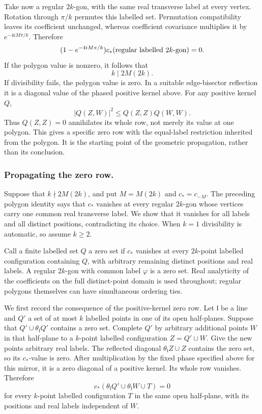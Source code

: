 \documentclass[11pt,letterpaper,reqno]{amsart}
\theoremstyle{definition}
\theoremstyle{remark}
\begin{document}
Take now a regular $2k$-gon, with the same real transverse label at
every vertex. Rotation through $\pi/k$ permutes this labelled set.
Permutation compatibility leaves its coefficient unchanged, whereas
coefficient covariance multiplies it by $e^{-4iM\pi/k}$. Therefore
\[
 (1-e^{-4iM\pi/k})c_*(\hbox{regular labelled }2k\hbox{-gon})=0.
\]
If the polygon value is nonzero, it follows that
\begin{equation}\label{eq:polygon}
 k\mid2M(2k).
\end{equation}
If divisibility fails, the polygon value is zero. In a suitable
edge-bisector reflection it is a diagonal value of the phased
positive kernel above. For any positive kernel $Q$,
\[
 |Q(Z,W)|^2\le Q(Z,Z)Q(W,W).
\]
Thus $Q(Z,Z)=0$ annihilates its whole row, not merely its value at
one polygon. This gives a specific zero row with the equal-label
restriction inherited from the polygon. It is the starting point of
the geometric propagation, rather than its conclusion.


\subsubsection*{Propagating the zero row.}
\label{hyp:polygon-propagation}
Suppose that $k\nmid2M(2k)$, and put $M=M(2k)$ and $c_*=c_{-M}$.
The preceding polygon identity says that $c_*$ vanishes at every
regular $2k$-gon whose vertices carry one common real transverse
label. We show that it vanishes for all labels and all distinct
positions, contradicting its choice. When $k=1$ divisibility is
automatic, so assume $k\ge2$.

Call a finite labelled set $Q$ a zero set if $c_*$ vanishes at every
$2k$-point labelled configuration containing $Q$, with arbitrary
remaining distinct positions and real labels. A regular $2k$-gon
with common label $\varphi$ is a zero set. Real analyticity of the
coefficients on the full distinct-point domain is used throughout;
regular polygons themselves can have simultaneous ordering ties.

We first record the consequence of the positive-kernel zero row.
Let $\mathfrak l$ be a line and $Q'$ a set of at most $k$ labelled
points in one of its open half-planes. Suppose that
$Q'\cup\theta_{\mathfrak l}Q'$ contains a zero set. Complete $Q'$
by arbitrary additional points $W$ in that half-plane to a
$k$-point labelled configuration $Z=Q'\cup W$. Give the new points
arbitrary real labels. The reflected diagonal
$\theta_{\mathfrak l}Z\cup Z$ contains the zero set, so its
$c_*$-value is zero. After multiplication by the fixed phase
specified above for this mirror, it is a zero diagonal of a positive
kernel. Its whole row vanishes. Therefore
\[
 c_*(\theta_{\mathfrak l}Q'\cup
          \theta_{\mathfrak l}W\cup T)=0
\]
for every $k$-point labelled configuration $T$ in the same open
half-plane, with its positions and real labels independent of $W$.
\end{document}
